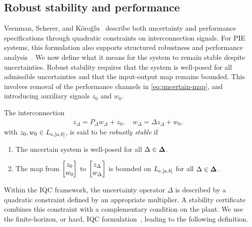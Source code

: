 \subsection{Robust stability and performance}
Veenman, Scherer, and K\"oro\u{g}lu~\cite{veenman2016robust} describe both
uncertainty and performance specifications through quadratic constraints on
interconnection signals.
For PIE systems, this formulation also supports structured robustness and
performance analysis~\cite{lenssen2025muanalysissynthesisframeworkpartial}.
We now define what it means for the system to remain stable despite
uncertainties.
Robust stability requires that the system is well-posed for all admissible
uncertainties and that the input-output map remains bounded.
This involves removal of the performance channels in
\eqref{eq:uncertain-map}, and
introducing auxiliary signals $z_0$ and $w_0$.
\begin{definition}
The interconnection
\begin{align*}
z_\Delta = P_\Delta w_\Delta + z_0, \quad
w_\Delta = \Delta z_\Delta + w_0,
\end{align*}
with $z_0, w_0 \in L_{{\mathrm{e}},[a,b]}$, is said to be
\emph{robustly stable} if
\begin{enumerate}
\item The uncertain system is well-posed for all $\Delta\in\mathbf{\Delta}$.
\item The map from $\begin{bmatrix}z_0\\w_0\end{bmatrix}$ to
$\begin{bmatrix}z_\Delta\\w_\Delta\end{bmatrix}$ is bounded on $L_{{\mathrm{e}},[a,b]}$
for all $\Delta\in\mathbf{\Delta}$.
\end{enumerate}
\end{definition}
Within the IQC framework, the uncertainty operator $\Delta$ is described by a
quadratic constraint defined by an appropriate multiplier. A stability
certificate combines this constraint with a complementary condition on the
plant. We use the finite-horizon, or hard, IQC
formulation~\cite{6915700,10156335}, leading to the following definition.
